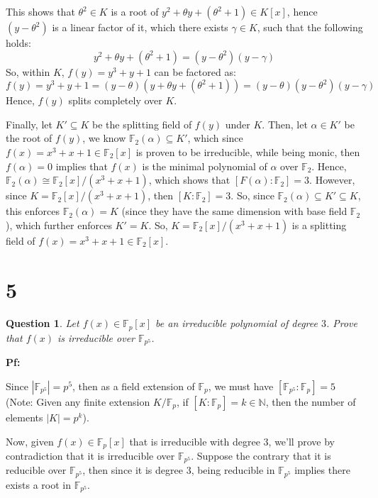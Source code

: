 \documentclass{article}
\newtheorem{question}{Question}
\begin{document}
This shows that $\theta^2\in K$ is a root of $y^2+\theta y+(\theta^2+1)\in K[x]$, hence $(y-\theta^2)$ is a linear factor of it, which there exists $\gamma\in K$, such that the following holds:
$$y^2+\theta y + (\theta^2+1) = (y-\theta^2)(y-\gamma)$$
So, within $K$, $f(y)=y^3+y+1$ can be factored as:
$$f(y)=y^3+y+1 = (y-\theta)(y+\theta y+(\theta^2+1)) = (y-\theta)(y-\theta^2)(y-\gamma)$$
Hence, $f(y)$ splits completely over $K$.

\hfil

Finally, let $K'\subseteq K$ be the splitting field of $f(y)$ under $K$. Then, let $\alpha\in K'$ be the root of $f(y)$, we know $\mathbb{F}_2(\alpha)\subseteq K'$, which since $f(x)=x^3+x+1\in \mathbb{F}_2[x]$ is proven to be irreducible, while being monic, then $f(\alpha) = 0$ implies that $f(x)$ is the minimal polynomial of $\alpha$ over $\mathbb{F}_2$. Hence, $\mathbb{F}_2(\alpha)\cong \mathbb{F}_2[x]/(x^3+x+1)$, which shows that $[F(\alpha):\mathbb{F}_2]=3$. However, since $K=\mathbb{F}_2[x]/(x^3+x+1)$, then $[K:\mathbb{F}_2]=3$. So, since $\mathbb{F}_2(\alpha)\subseteq K'\subseteq K$, this enforces $\mathbb{F}_2(\alpha) = K$ (since they have the same dimension with base field $\mathbb{F}_2$), which further enforces $K'=K$. So, $K=\mathbb{F}_2[x]/(x^3+x+1)$ is a splitting field of $f(x)=x^3+x+1\in\mathbb{F}_2[x]$.

\break

\section*{5}
\begin{myBox}[]{}
    \begin{question}
        Let $f(x)\in\mathbb{F}_p[x]$ be an irreducible polynomial of degree $3$. Prove that $f(x)$ is irreducible over $\mathbb{F}_{p^5}$.
    \end{question}
\end{myBox}

\textbf{Pf:}

Since $|\mathbb{F}_{p^5}| = p^5$, then as a field extension of $\mathbb{F}_p$, we must have $[\mathbb{F}_{p^5}:\mathbb{F}_p]=5$ (Note: Given any finite extension $K/\mathbb{F}_p$, if $[K:\mathbb{F}_p]=k\in \mathbb{N}$, then the number of elements $|K| = p^k$).

Now, given $f(x)\in\mathbb{F}_p[x]$ that is irreducible with degree $3$, we'll prove by contradiction that it is irreducible over $\mathbb{F}_{p^5}$.
Suppose the contrary that it is reducible over $\mathbb{F}_{p^5}$, then since it is degree $3$, being reducible in $\mathbb{F}_{p^5}$ implies there exists a root in $\mathbb{F}_{p^5}$. 
\end{document}
